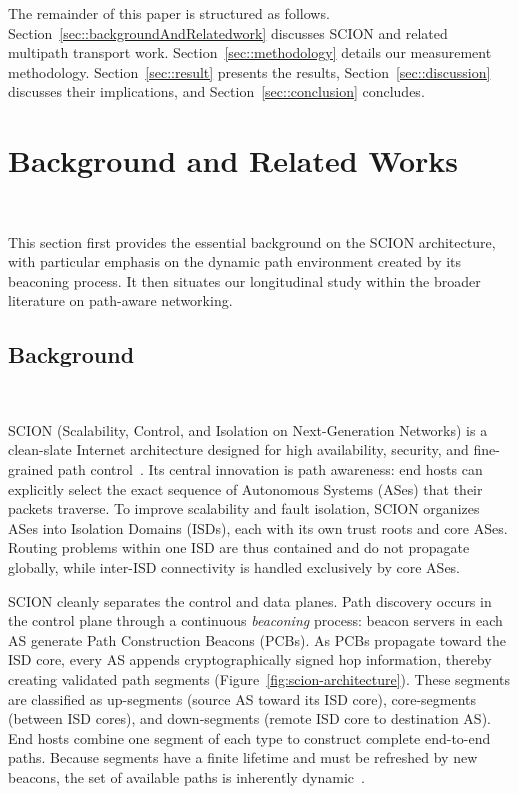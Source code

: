 \documentclass[pdflatex,sn-vancouver-num]{sn-jnl}%
\theoremstyle{thmstyleone}%
\theoremstyle{thmstyletwo}%
\theoremstyle{thmstylethree}%
\begin{document}
    The remainder of this paper is structured as follows. 
    Section~\ref{sec::backgroundAndRelatedwork} discusses SCION and related multipath transport work. 
    Section~\ref{sec::methodology} details our measurement methodology. 
    Section~\ref{sec::result} presents the results, Section~\ref{sec::discussion} discusses their implications, and Section~\ref{sec::conclusion} concludes.

\section{Background and Related Works}~\label{sec::backgroundAndRelatedwork}

    This section first provides the essential background on the SCION architecture, with particular emphasis on the dynamic path environment created by its beaconing process. It then situates our longitudinal study within the broader literature on path-aware networking.

\subsection{Background}~\label{subsec::background}

    SCION (Scalability, Control, and Isolation on Next-Generation Networks) is a clean-slate Internet architecture designed for high availability, security, and fine-grained path control~\cite{zhang2011scion}. Its central innovation is path awareness: end hosts can explicitly select the exact sequence of Autonomous Systems (ASes) that their packets traverse. To improve scalability and fault isolation, SCION organizes ASes into Isolation Domains (ISDs), each with its own trust roots and core ASes. Routing problems within one ISD are thus contained and do not propagate globally, while inter-ISD connectivity is handled exclusively by core ASes.

    SCION cleanly separates the control and data planes. Path discovery occurs in the control plane through a continuous \emph{beaconing} process: beacon servers in each AS generate Path Construction Beacons (PCBs). As PCBs propagate toward the ISD core, every AS appends cryptographically signed hop information, thereby creating validated path segments (Figure~\ref{fig:scion-architecture}). These segments are classified as up-segments (source AS toward its ISD core), core-segments (between ISD cores), and down-segments (remote ISD core to destination AS). End hosts combine one segment of each type to construct complete end-to-end paths. Because segments have a finite lifetime and must be refreshed by new beacons, the set of available paths is inherently dynamic~\cite{krahenbuhl2024glids}.
\end{document}
